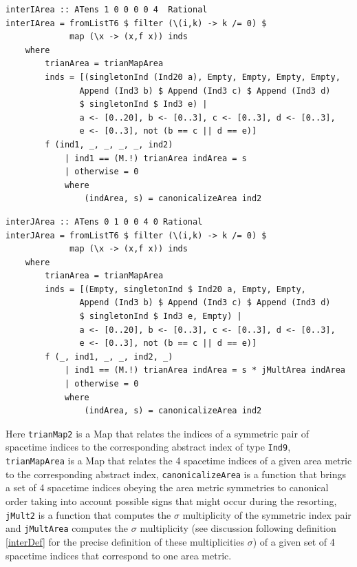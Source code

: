 \documentclass[a4paper,12pt, DIV=14, BCOR=5mm, twoside, headsepline]{scrbook}
\begin{document}
\begin{samepage}
\begin{verbatim}
interIArea :: ATens 1 0 0 0 0 4  Rational
interIArea = fromListT6 $ filter (\(i,k) -> k /= 0) $
             map (\x -> (x,f x)) inds
    where
        trianArea = trianMapArea
        inds = [(singletonInd (Ind20 a), Empty, Empty, Empty, Empty,
               Append (Ind3 b) $ Append (Ind3 c) $ Append (Ind3 d) 
               $ singletonInd $ Ind3 e) |
               a <- [0..20], b <- [0..3], c <- [0..3], d <- [0..3],
               e <- [0..3], not (b == c || d == e)]
        f (ind1, _, _, _, _, ind2)
            | ind1 == (M.!) trianArea indArea = s
            | otherwise = 0
            where
                (indArea, s) = canonicalizeArea ind2
\end{verbatim} 
\end{samepage}

\begin{samepage}
\begin{verbatim}
interJArea :: ATens 0 1 0 0 4 0 Rational
interJArea = fromListT6 $ filter (\(i,k) -> k /= 0) $
             map (\x -> (x,f x)) inds
    where
        trianArea = trianMapArea
        inds = [(Empty, singletonInd $ Ind20 a, Empty, Empty,
               Append (Ind3 b) $ Append (Ind3 c) $ Append (Ind3 d)
               $ singletonInd $ Ind3 e, Empty) |
               a <- [0..20], b <- [0..3], c <- [0..3], d <- [0..3],
               e <- [0..3], not (b == c || d == e)]
        f (_, ind1, _, _, ind2, _)
            | ind1 == (M.!) trianArea indArea = s * jMultArea indArea
            | otherwise = 0
            where
                (indArea, s) = canonicalizeArea ind2
\end{verbatim} 
\end{samepage}

Here \texttt{trianMap2} is a Map that relates the indices of a symmetric pair of spacetime indices to the corresponding abstract index of type \texttt{Ind9}, \texttt{trianMapArea} is a Map that relates the 4 spacetime indices of a given area metric to the corresponding abstract index, \texttt{canonicalizeArea} is a function that brings a set of 4 spacetime indices obeying the area metric symmetries to canonical order taking into account possible signs that might occur during the resorting, \texttt{jMult2} is a function that computes the $\sigma$ multiplicity of the symmetric index pair and \texttt{jMultArea} computes the $\sigma$ multiplicity (see discussion following definition \ref{interDef} for the precise definition of these multiplicities $\sigma$) of a given set of 4 spacetime indices that correspond to one area metric.
\end{document}

